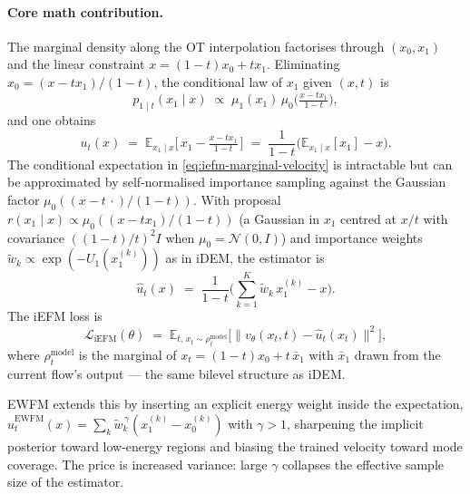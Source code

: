 \documentclass[11pt,letterpaper]{article}
\newcommand{\E}{\mathbb{E}}
\theoremstyle{plain}
\begin{document}
\paragraph{Core math contribution.} The marginal density along the OT
interpolation factorises through $(x_0,x_1)$ and the linear constraint
$x = (1-t)x_0 + t x_1$. Eliminating $x_0=(x-t x_1)/(1-t)$, the conditional
law of $x_1$ given $(x,t)$ is
\begin{equation}
  p_{1\mid t}(x_1\mid x) \;\propto\; \mu_1(x_1)\,\mu_0\!\Big(\tfrac{x-t x_1}{1-t}\Big),
  \label{eq:iefm-posterior}
\end{equation}
and one obtains
\begin{equation}
  u_t(x) \;=\; \E_{x_1\mid x}\!\Big[\,x_1 - \tfrac{x-t x_1}{1-t}\,\Big]
  \;=\; \frac{1}{1-t}\Big(\E_{x_1\mid x}[x_1] - x\Big).
  \label{eq:iefm-marginal-velocity}
\end{equation}
The conditional expectation in \eqref{eq:iefm-marginal-velocity} is
intractable but can be approximated by self-normalised importance sampling
against the Gaussian factor $\mu_0((x-t\,\cdot)/(1-t))$. With proposal
$r(x_1\mid x)\propto\mu_0((x-tx_1)/(1-t))$ (a Gaussian in $x_1$ centred at
$x/t$ with covariance $((1-t)/t)^2 I$ when $\mu_0=\mathcal N(0,I)$) and
importance weights $\widetilde w_k\propto\exp(-U_1(x_1^{(k)}))$ as in iDEM,
the estimator is
\begin{equation}
  \widehat u_t(x) \;=\; \frac{1}{1-t}\!\Big(\sum_{k=1}^{K}\widetilde w_k\,x_1^{(k)} - x\Big).
  \label{eq:iefm-estimator}
\end{equation}
The iEFM loss is
\begin{equation}
  \mathcal L_{\mathrm{iEFM}}(\theta) \;=\; \E_{t,\,x_t\sim\rho_t^{\mathrm{model}}}\!
  \Big[\big\|v_\theta(x_t,t) - \widehat u_t(x_t)\big\|^2\Big],
  \label{eq:iefm-loss}
\end{equation}
where $\rho_t^{\mathrm{model}}$ is the marginal of
$x_t=(1-t)x_0 + t\,\bar x_1$ with $\bar x_1$ drawn from the current flow's
output --- the same bilevel structure as iDEM.

EWFM extends this by inserting an explicit energy weight inside the
expectation, $\widehat u_t^{\mathrm{EWFM}}(x) = \sum_k\widetilde w_k^{\,\gamma}
(x_1^{(k)}-x_0^{(k)})$ with $\gamma>1$, sharpening the implicit posterior
toward low-energy regions and biasing the trained velocity toward mode
coverage. The price is increased variance: large $\gamma$ collapses the
effective sample size of the estimator.
\end{document}
